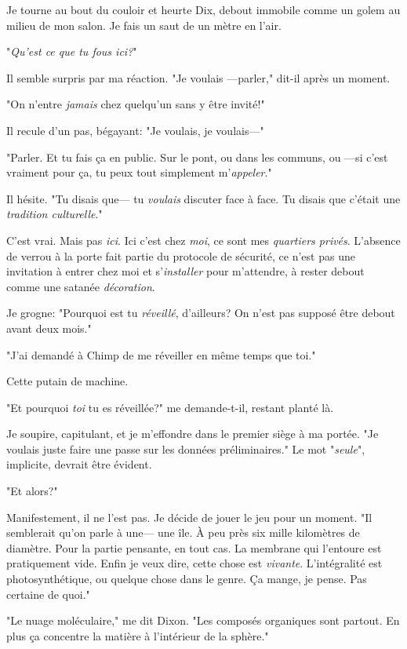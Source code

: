 Je tourne au bout du couloir et heurte Dix, debout immobile comme un golem au milieu de mon salon. Je fais un saut de un mètre en l'air.

"\emph{Qu'est ce que tu fous ici?}"

Il semble surpris par ma réaction. "Je voulais —parler," dit-il après un moment.

"On n'entre \emph{jamais} chez quelqu'un sans y être invité!"

Il recule d'un pas, bégayant: "Je voulais, je voulais—"

"Parler. Et tu fais ça en public. Sur le pont, ou dans les communs, ou —si c'est vraiment pour ça, tu peux tout simplement m'\emph{appeler}."

Il hésite. "Tu disais que— tu \emph{voulais} discuter face à face. Tu disais que c’était une \emph{tradition culturelle}."

C'est vrai. Mais pas \emph{ici}. Ici c'est chez \emph{moi}, ce sont mes \emph{quartiers privés}. L'absence de verrou à la porte fait partie du protocole de sécurité, ce n'est pas une invitation à entrer chez moi et s'\emph{installer} pour m'attendre, à rester debout comme une satanée \emph{décoration}.

Je grogne: "Pourquoi est tu \emph{réveillé}, d'ailleurs? On n'est pas supposé être debout avant deux mois."

"J'ai demandé à Chimp de me réveiller en même temps que toi."

Cette putain de machine.

"Et pourquoi \emph{toi} tu es réveillée?" me demande-t-il, restant planté là.

Je soupire, capitulant, et je m'effondre dans le premier siège à ma portée. "Je voulais juste faire une passe sur les données préliminaires." Le mot "\emph{seule}", implicite, devrait être évident.

"Et alors?"

Manifestement, il ne l'est pas. Je décide de jouer le jeu pour un moment. "Il semblerait qu'on parle à une— une île. À peu près six mille kilomètres de diamètre. Pour la partie pensante, en tout cas. La membrane qui l'en\-toure est pratiquement vide. Enfin je veux dire, cette chose est \emph{vivante}. L'in\-té\-gra\-lité est photosynthétique, ou quelque chose dans le genre. Ça mange, je pense. Pas certaine de quoi."

"Le nuage moléculaire," me dit Dixon. "Les composés organiques sont partout. En plus ça concentre la matière à l'intérieur de la sphère."

